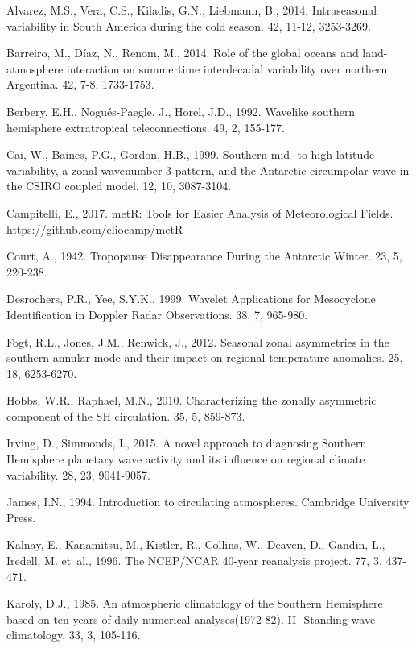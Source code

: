 \documentclass[spanish,a4paper,12pt,oneside]{book}
\begin{document}
\hypertarget{refs}{}
\hypertarget{ref-Alvarez2014}{}
Alvarez, M.S., Vera, C.S., Kiladis, G.N., Liebmann, B., 2014.
Intraseasonal variability in South America during the cold season. 42,
11-12, 3253-3269.

\hypertarget{ref-Barreiro2014}{}
Barreiro, M., Díaz, N., Renom, M., 2014. Role of the global oceans and
land-atmosphere interaction on summertime interdecadal variability over
northern Argentina. 42, 7-8, 1733-1753.

\hypertarget{ref-Berbery1992}{}
Berbery, E.H., Nogués-Paegle, J., Horel, J.D., 1992. Wavelike southern
hemisphere extratropical teleconnections. 49, 2, 155-177.

\hypertarget{ref-Cai1999}{}
Cai, W., Baines, P.G., Gordon, H.B., 1999. Southern mid- to
high-latitude variability, a zonal wavenumber-3 pattern, and the
Antarctic circumpolar wave in the CSIRO coupled model. 12, 10,
3087-3104.

\hypertarget{ref-R-metR}{}
Campitelli, E., 2017. metR: Tools for Easier Analysis of Meteorological
Fields. \url{https://github.com/eliocamp/metR}

\hypertarget{ref-Court1942}{}
Court, A., 1942. Tropopause Disappearance During the Antarctic Winter.
23, 5, 220-238.

\hypertarget{ref-Desrochers1999}{}
Desrochers, P.R., Yee, S.Y.K., 1999. Wavelet Applications for
Mesocyclone Identification in Doppler Radar Observations. 38, 7,
965-980.

\hypertarget{ref-Fogt2012}{}
Fogt, R.L., Jones, J.M., Renwick, J., 2012. Seasonal zonal asymmetries
in the southern annular mode and their impact on regional temperature
anomalies. 25, 18, 6253-6270.

\hypertarget{ref-Hobbs2010}{}
Hobbs, W.R., Raphael, M.N., 2010. Characterizing the zonally asymmetric
component of the SH circulation. 35, 5, 859-873.

\hypertarget{ref-Irving2015}{}
Irving, D., Simmonds, I., 2015. A novel approach to diagnosing Southern
Hemisphere planetary wave activity and its influence on regional climate
variability. 28, 23, 9041-9057.

\hypertarget{ref-James}{}
James, I.N., 1994. Introduction to circulating atmospheres. Cambridge
University Press.

\hypertarget{ref-Kalnay1996}{}
Kalnay, E., Kanamitsu, M., Kistler, R., Collins, W., Deaven, D., Gandin,
L., Iredell, M. et~al., 1996. The NCEP/NCAR 40-year reanalysis project.
77, 3, 437-471.

\hypertarget{ref-Karoly1985}{}
Karoly, D.J., 1985. An atmospheric climatology of the Southern
Hemisphere based on ten years of daily numerical analyses(1972-82). II-
Standing wave climatology. 33, 3, 105-116.
\end{document}

